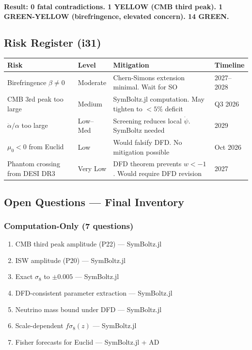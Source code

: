 \documentclass[11pt,a4paper]{article}
\begin{document}
\textbf{Result: 0 fatal contradictions. 1 YELLOW (CMB third peak). 1 GREEN-YELLOW (birefringence, elevated concern). 14 GREEN.}

\subsection{Risk Register (i31)}

\begin{center}
\begin{longtable}{p{3cm}lp{5cm}l}
\toprule
\textbf{Risk} & \textbf{Level} & \textbf{Mitigation} & \textbf{Timeline} \\
\midrule
\endfirsthead
Birefringence $\beta \neq 0$ & Moderate & Chern-Simons extension minimal. Wait for SO & 2027--2028 \\
CMB 3rd peak too large & Medium & SymBoltz.jl computation. May tighten to $< 5\%$ deficit & Q3 2026 \\
$\dot\alpha/\alpha$ too large & Low--Med & Screening reduces local $\dot\psi$. SymBoltz needed & 2029 \\
$\mu_0 < 0$ from Euclid & Low & Would falsify DFD. No mitigation possible & Oct 2026 \\
Phantom crossing from DESI DR3 & Very Low & DFD theorem prevents $w < -1$. Would require DFD revision & 2027 \\
\bottomrule
\end{longtable}
\end{center}

\subsection{Open Questions --- Final Inventory}

\subsubsection{Computation-Only (7 questions)}
\begin{enumerate}
\item CMB third peak amplitude (P22) --- SymBoltz.jl
\item ISW amplitude (P20) --- SymBoltz.jl
\item Exact $\sigma_8$ to $\pm 0.005$ --- SymBoltz.jl
\item DFD-consistent parameter extraction --- SymBoltz.jl
\item Neutrino mass bound under DFD --- SymBoltz.jl
\item Scale-dependent $f\sigma_8(z)$ --- SymBoltz.jl
\item Fisher forecasts for Euclid --- SymBoltz.jl + AD
\end{enumerate}
\end{document}
